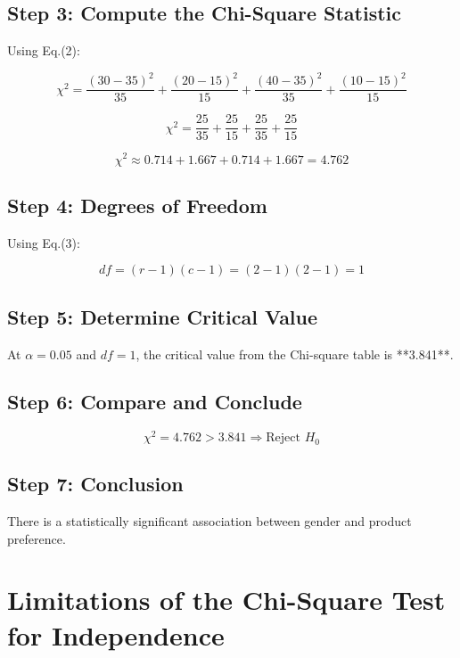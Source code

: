 \documentclass[12pt]{article}
\begin{document}
\subsection*{Step 3: Compute the Chi-Square Statistic}

Using Eq.(2):

\[
\chi^2 = \frac{(30 - 35)^2}{35} + \frac{(20 - 15)^2}{15} + \frac{(40 - 35)^2}{35} + \frac{(10 - 15)^2}{15}
\]

\[
\chi^2 = \frac{25}{35} + \frac{25}{15} + \frac{25}{35} + \frac{25}{15}
\]

\[
\chi^2 \approx 0.714 + 1.667 + 0.714 + 1.667 = 4.762
\]

\subsection*{Step 4: Degrees of Freedom}
Using Eq.(3):

\[
df = (r - 1)(c - 1) = (2 - 1)(2 - 1) = 1
\]

\subsection*{Step 5: Determine Critical Value}

At $\alpha = 0.05$ and $df = 1$, the critical value from the Chi-square table is **3.841**.

\subsection*{Step 6: Compare and Conclude}

\[
\chi^2 = 4.762 > 3.841 \Rightarrow \text{Reject } H_0
\]

\subsection*{Step 7: Conclusion} There is a statistically significant association between gender and product preference.

\section{Limitations of the Chi-Square Test for Independence}
\end{document}
